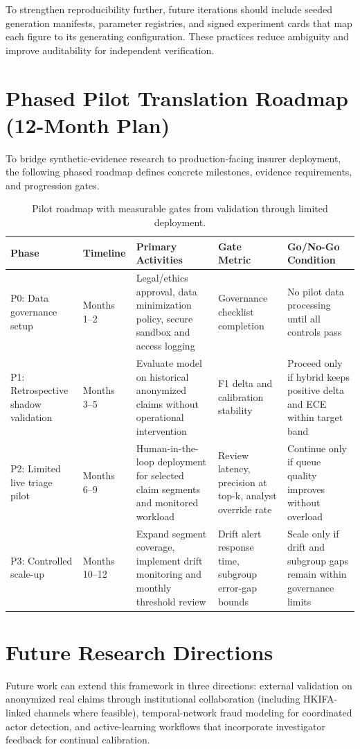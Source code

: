 \documentclass[12pt,a4paper]{report}
\begin{document}
To strengthen reproducibility further, future iterations should include seeded generation manifests, parameter registries, and signed experiment cards that map each figure to its generating configuration. These practices reduce ambiguity and improve auditability for independent verification.

\section{Phased Pilot Translation Roadmap (12-Month Plan)}
To bridge synthetic-evidence research to production-facing insurer deployment, the following phased roadmap defines concrete milestones, evidence requirements, and progression gates.

\begin{table}[H]
\caption{Pilot roadmap with measurable gates from validation through limited deployment.}
\label{tab:pilot_roadmap}
\begin{tabular}{p{}p{}p{}p{}p{}}
\toprule
\textbf{Phase} & \textbf{Timeline} & \textbf{Primary Activities} & \textbf{Gate Metric} & \textbf{Go/No-Go Condition} \\
\midrule
P0: Data governance setup & Months 1--2 & Legal/ethics approval, data minimization policy, secure sandbox and access logging & Governance checklist completion & No pilot data processing until all controls pass \\
P1: Retrospective shadow validation & Months 3--5 & Evaluate model on historical anonymized claims without operational intervention & F1 delta and calibration stability & Proceed only if hybrid keeps positive delta and ECE within target band \\
P2: Limited live triage pilot & Months 6--9 & Human-in-the-loop deployment for selected claim segments and monitored workload & Review latency, precision at top-k, analyst override rate & Continue only if queue quality improves without overload \\
P3: Controlled scale-up & Months 10--12 & Expand segment coverage, implement drift monitoring and monthly threshold review & Drift alert response time, subgroup error-gap bounds & Scale only if drift and subgroup gaps remain within governance limits \\
\bottomrule
\end{tabular}
\end{table}

\section{Future Research Directions}
Future work can extend this framework in three directions: external validation on anonymized real claims through institutional collaboration (including HKIFA-linked channels where feasible), temporal-network fraud modeling for coordinated actor detection, and active-learning workflows that incorporate investigator feedback for continual calibration.
\end{document}
